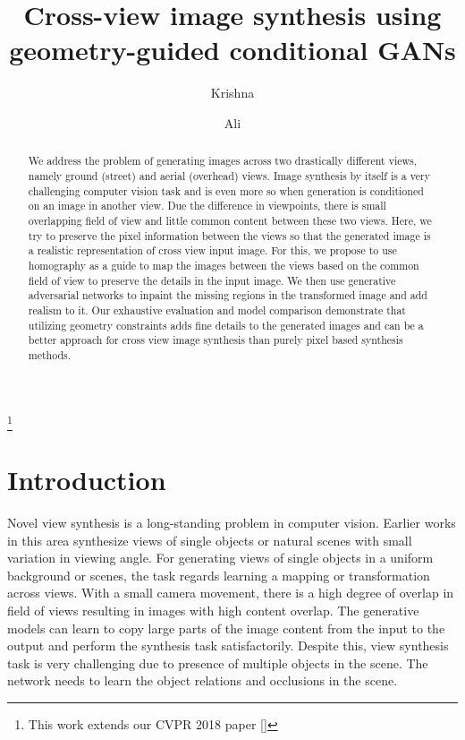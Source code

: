 \documentclass[times,twocolumn,final,authoryear]{elsarticle_modified}
\begin{document}
\begin{frontmatter}


\title{Cross-view image synthesis using geometry-guided conditional GANs}



\author{Krishna } 
\address{Center for Research in Computer Vision (CRCV), University of Central Florida, Orlando, FL, USA}
\author{Ali }
\address{Markable.AI, Newyork, USA}



\begin{abstract}
We address the problem of generating images across two drastically different views, namely ground (street) and aerial (overhead) views. Image synthesis by itself is a very challenging computer vision task and is even more so when generation is conditioned on an image in another view. Due the difference in viewpoints, there is small overlapping field of view and little common content between these two views. Here, we try to preserve the pixel information between the views so that the generated image is a realistic representation of cross view input image. For this, we propose to use homography as a guide to map the images between the views based on the common field of view to preserve the details in the input image. We then use generative adversarial networks to inpaint the missing regions in the transformed image and add realism to it. Our exhaustive evaluation and model comparison demonstrate that utilizing geometry constraints adds fine details to the generated images and can be a better approach for cross view image synthesis than purely pixel based synthesis methods. 

\end{abstract}

\end{frontmatter}

{\let\thefootnote\relax\footnote{{This work extends our CVPR 2018 paper [\cite{Regmi_2018_CVPR}]}}}



\section{Introduction} 
Novel view synthesis is a long-standing problem in computer vision. Earlier works in this area synthesize views of single objects or natural scenes with small variation in viewing angle. 
For generating views of single objects in a uniform background or scenes, the task regards learning a mapping or transformation across views. 
With a small camera movement, there is a high degree of overlap in field of views resulting in images with high content overlap. The generative models can learn to copy large parts of the image content from the input to the output and perform the synthesis task satisfactorily. Despite this, view synthesis task is very challenging due to presence of multiple objects in the scene. The network needs to learn the object relations and occlusions in the scene. 
\end{document}
